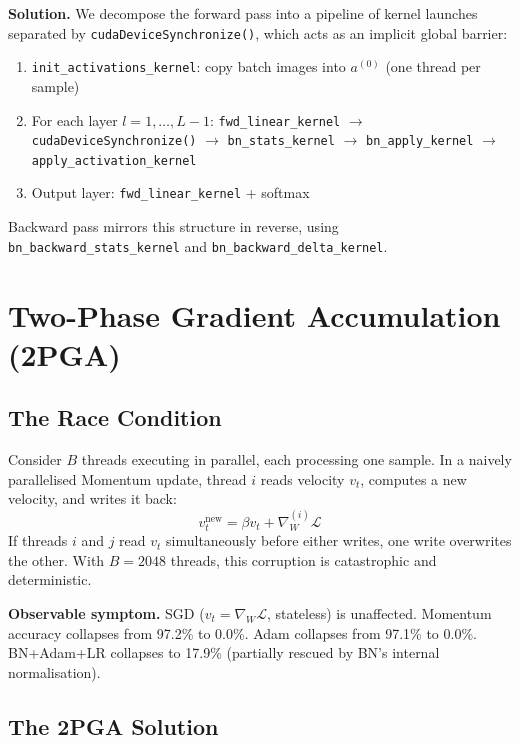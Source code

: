 \documentclass[conference]{IEEEtran}
\begin{document}
\textbf{Solution.} We decompose the forward pass into a pipeline of kernel launches separated by \texttt{cudaDeviceSynchronize()}, which acts as an implicit global barrier:
\begin{enumerate}
  \item \texttt{init\_activations\_kernel}: copy batch images into $a^{(0)}$ (one thread per sample)
  \item For each layer $l=1,\ldots,L{-}1$: \texttt{fwd\_linear\_kernel} $\to$ \texttt{cudaDeviceSynchronize()} $\to$ \texttt{bn\_stats\_kernel} $\to$ \texttt{bn\_apply\_kernel} $\to$ \texttt{apply\_activation\_kernel}
  \item Output layer: \texttt{fwd\_linear\_kernel} + softmax
\end{enumerate}
Backward pass mirrors this structure in reverse, using \texttt{bn\_backward\_stats\_kernel} and \texttt{bn\_backward\_delta\_kernel}.

\section{Two-Phase Gradient Accumulation (2PGA)}

\subsection{The Race Condition}

Consider $B$ threads executing in parallel, each processing one sample. In a naively parallelised Momentum update, thread $i$ reads velocity $v_t$, computes a new velocity, and writes it back:
\begin{equation}
v_t^{\text{new}} = \beta v_t + \nabla_W^{(i)} \mathcal{L}
\end{equation}
If threads $i$ and $j$ read $v_t$ simultaneously before either writes, one write overwrites the other. With $B=2048$ threads, this corruption is catastrophic and deterministic.

\textbf{Observable symptom.} SGD ($v_t = \nabla_W \mathcal{L}$, stateless) is unaffected. Momentum accuracy collapses from 97.2\% to 0.0\%. Adam collapses from 97.1\% to 0.0\%. BN+Adam+LR collapses to 17.9\% (partially rescued by BN's internal normalisation).

\subsection{The 2PGA Solution}
\end{document}
